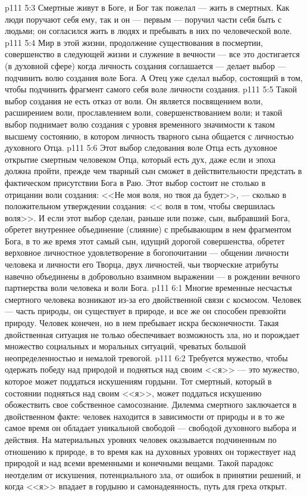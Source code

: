 \vs p111 5:3 Смертные живут в Боге, и Бог так пожелал --- жить в смертных. Как люди поручают себя ему, так и он --- первым --- поручил части себя быть с людьми; он согласился жить в людях и пребывать в них по человеческой воле.
\vs p111 5:4 Мир в этой жизни, продолжение существования в посмертии, совершенство в следующей жизни и служение в вечности --- все это достигается (в духовной сфере)  когда личность создания соглашается --- делает выбор --- подчинить волю создания воле Бога. А Отец уже сделал выбор, состоящий в том, чтобы подчинить фрагмент самого себя воле личности создания.
\vs p111 5:5 Такой выбор создания не есть отказ от воли. Он является посвящением воли, расширением воли, прославлением воли, совершенствованием воли; и такой выбор поднимает волю создания с уровня временного значимости к таком высшему состоянию, в котором личность тварного сына общается с личностью духовного Отца.
\vs p111 5:6 Этот выбор следования воле Отца есть духовное открытие смертным человеком Отца, который есть дух, даже если и эпоха должна пройти, прежде чем тварный сын сможет в действительности предстать в фактическом присутствии Бога в Раю. Этот выбор состоит не столько в отрицании воли создания: <<Не моя воля, но твоя да будет>>, --- сколько в положительном утверждении создания: << воля в том, чтобы свершилась  воля>>. И если этот выбор сделан, раньше или позже, сын, выбравший Бога, обретет внутреннее объединение (слияние) с пребывающим в нем фрагментом Бога, в то же время этот самый сын, идущий дорогой совершенства, обретет верховное личностное удовлетворение в богопочитании --- общении личности человека и личности его Творца, двух личностей, чьи творческие атрибуты навечно объединены в добровольно взаимном выражении --- в рождении вечного партнерства воли человека и воли Бога.
\vs p111 6:1 Многие временные несчастья смертного человека возникают из\hyp{}за его двойственной связи с космосом. Человек --- часть природы, он существует в природе, и все же он способен превзойти природу. Человек конечен, но в нем пребывает искра бесконечности. Такая двойственная ситуация не только обеспечивает возможность зла, но и порождает множество социальных и моральных ситуаций, чреватых большой неопределенностью и немалой тревогой.
\vs p111 6:2 Требуется мужество, чтобы одержать победу над природой и подняться над своим <<я>> --- это мужество, которое может поддаться искушениям гордыни. Тот смертный, который в состоянии подняться над своим <<я>>, может поддаться искушению обожествить свое собственное самосознание. Дилемма смертного заключается в двойственном факте: человек находится в зависимости от природы и в то же самое время он обладает уникальной свободой --- свободой духовного выбора и действия. На материальных уровнях человек оказывается подчиненным по отношению к природе, в то время как на духовных уровнях он торжествует над природой и над всеми временными и конечными вещами. Такой парадокс неотделим от искушения, потенциального зла, от ошибок в принятии решений, и когда <<я>> впадает в гордыню и самонадеянность, путь для греха открыт.
